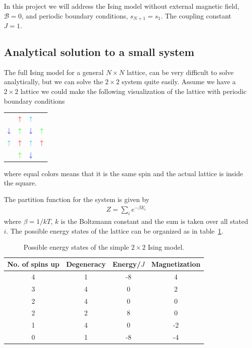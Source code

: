 \documentclass[twoside, 11pt]{article}
\begin{document}
	In this project we will address the Ising model without external magnetic field, $\mathcal{B}=0$, and periodic boundary conditions, $s_{N+1}=s_1$. The coupling constant $J=1$. 
	
	\subsection{Analytical solution to a small system}
		The full Ising model for a general $N\times N$ lattice, can be very difficult to solve analytically, but we can solve the $2\times 2$ system quite easily. Assume we have a $2\times 2$ lattice we could make the following visualization of the lattice with periodic boundary conditions
		\begin{table}[H]
			\centering
			\begin{tabular}{c c c c}
				& ${\color{red}\uparrow}$ 	& ${\color{cyan}\uparrow}$ \\\cline{2-3}
				\multicolumn{1}{c|}{${\color{blue}\downarrow}$}	&	${\color{green}\uparrow}$ & \multicolumn{1}{c|}{${\color{blue}\downarrow}$} & ${\color{green}\uparrow}$ \\
				\multicolumn{1}{c|}{${\color{cyan}\uparrow}$}	& ${\color{red}\uparrow}$	&	\multicolumn{1}{c|}{${\color{cyan}\uparrow}$}	&	${\color{red}\uparrow}$		\\\cline{2-3}
				&	${\color{green}\uparrow}$	&	${\color{blue}\downarrow}$		
			\end{tabular}
		\end{table}
		where equal colors means that it is the same spin and the actual lattice is inside the square. 
		
		The partition function for the system is given by
		\begin{align*}
			Z = \sum_{i} e^{-\beta E_i}
		\end{align*}
		where $\beta = 1/kT$, $k$ is the Boltzmann constant and the sum is taken over all stated $i$. The possible energy states of the lattice can be organized as in table~\ref{table: 2 by 2 lattice energy states}. 
		\begin{table}
			\centering
			\caption{Possible energy states of the simple $2\times 2$ Ising model.}
			\label{table: 2 by 2 lattice energy states}
			\begin{tabular}{c|c|c|c}
				No. of spins up		&	Degeneracy	&	Energy/$J$	&	Magnetization	\\ \hline
				4	&	1	&	-8	&	4	\\
				3	&	4	&	0	&	2	\\
				2	&	4	&	0	&	0	\\
				2	&	2	&	8	&	0	\\
				1	&	4	&	0	&	-2	\\
				0	&	1	&	-8	&	-4
			\end{tabular}
		\end{table}
		
\end{document}
